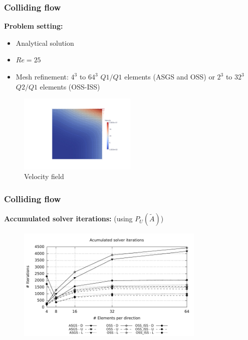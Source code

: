 \begin{frame}
  \frametitle{Colliding flow}
  \textbf{Problem setting:}
  \begin{itemize}
    \itemsep-0.10cm
 	\item Analytical solution
  	\item $Re=25$ 
  	\item Mesh refinement: $ 4^3 $ to $ 64^3 $ $ Q1/Q1 $ elements (ASGS and OSS) or $ 2^3 $ to $ 32^3 $$ Q2/Q1 $ elements (OSS-ISS)
  \end{itemize}
  \vspace*{-0.3cm}
  \begin{figure}
    \centering	
    \includegraphics[trim=10cm 3.5cm 5cm 3cm, clip=true, width=0.5\textwidth]{Figures/colliding_flow.pdf}
	\vspace*{-0.2cm}
	\caption{Velocity field}
  \end{figure}
\end{frame}
\begin{frame}
 \frametitle{Colliding flow}
 \textbf{Accumulated solver iterations:} (using $ P_U(\widetilde{A}) $)
  \vspace*{-0.25cm}
 \begin{figure}
     \centering	
     \includegraphics[width=0.8\textwidth]{Figures/colliding_iter.pdf}
   \end{figure}
 \begin{overlayarea}{\textwidth}{1.5cm}
  \end{overlayarea}
\end{frame}
